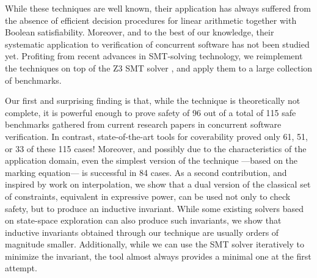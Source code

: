 While these techniques are well known, their application has always
suffered from the absence of efficient decision procedures for 
linear arithmetic together with Boolean satisfiability.  
Moreover, and to the best of our knowledge, their
systematic application to verification of concurrent software has not
been studied yet. Profiting from recent advances in SMT-solving
technology, we reimplement the techniques on top of the Z3 SMT solver
\cite{MouraB08}, and apply them to a large collection of benchmarks.

Our first and surprising finding is that, while the technique is theoretically not
complete, it is powerful enough to prove safety of 96 out of a total
of 115 safe benchmarks gathered from current research papers in concurrent software
verification. In contrast, state-of-the-art tools for coverability
proved only 61, 51, or 33 of these 115 cases!
Moreover, and possibly due to the characteristics of the
application domain, even the simplest version of the technique ---based on the marking equation--- is
successful in 84 cases. 
As a second contribution, and inspired
by work on interpolation, we show that a dual version of the classical
set of constraints, equivalent in expressive power, can be used not
only to check safety, but to produce an inductive invariant.
While some existing solvers based on state-space
exploration can also produce such invariants, we show that inductive invariants obtained
through our technique are usually orders
of magnitude smaller.  Additionally, while we can use the 
SMT solver iteratively to minimize the invariant, the tool almost always
provides a minimal one at the first attempt.


